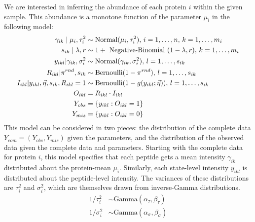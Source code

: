 We are interested in inferring the abundance of each protein $i$ within the given sample.
This abundance is a monotone function of the parameter $\mu_i$ in the following model:
%
\begin{align}
 \gamma_{ik}\mid\mu_{i}, \tau_{i}^2  &\sim \hbox{Normal}(\mu_{i},\tau_{i}^{2}), \, i=1,\ldots,n, \, k=1,\ldots,m_i \\
 s_{ik} \mid \lambda, r  &\sim 1+\hbox{ Negative-Binomial }(1-\lambda,r), \, k=1,\ldots,m_i \\
 y_{ikl} \vert \gamma_{ik}, \sigma_{i}^2   &\sim \hbox{Normal}(\gamma_{ik},\sigma_{i}^{2}), \, l=1,\ldots,s_{ik}\\
 R_{ikl} \vert \pi^{rnd}, s_{ik} &\sim \hbox{Bernoulli}(1 - \pi^{rnd}), \, l=1,\ldots,s_{ik} \\
 I_{ikl} \vert y_{ikl}, \vec \eta, s_{ik}, R_{ikl}=1 &\sim \hbox{Bernoulli}(1 - g(y_{ikl}; \vec \eta)), \, l=1,\ldots,s_{ik} \\
 O_{ikl} &= R_{ikl} \cdot I_{ikl} \\
 Y_{obs} &= \{y_{ikl} : O_{ikl} = 1\} \\
 Y_{mis} &= \{y_{ikl} : O_{ikl} = 0\}
\end{align}
%
This model can be considered in two pieces: the distribution of the complete data $Y_{com} = (Y_{obs}, Y_{mis})$ given the parameters, and the distribution of the observed data given the complete data and parameters.
Starting with the complete data for protein $i$, this model specifies that each peptide gets a mean intensity $\gamma_{ik}$ distributed about the protein-mean $\mu_i$.
Similarly, each state-level intensity $y_{ikl}$ is distributed about the peptide-level intensity.
The variances of these distributions are $\tau^2_i$ and $\sigma^2_i$, which are themselves drawn from inverse-Gamma distributions.
%
\begin{align}
1 / \tau_i^2 &\sim \text{Gamma}(\alpha_\tau, \beta_\tau) \\
1 / \sigma_i^2 &\sim \text{Gamma}(\alpha_\sigma, \beta_\sigma)
\end{align}


